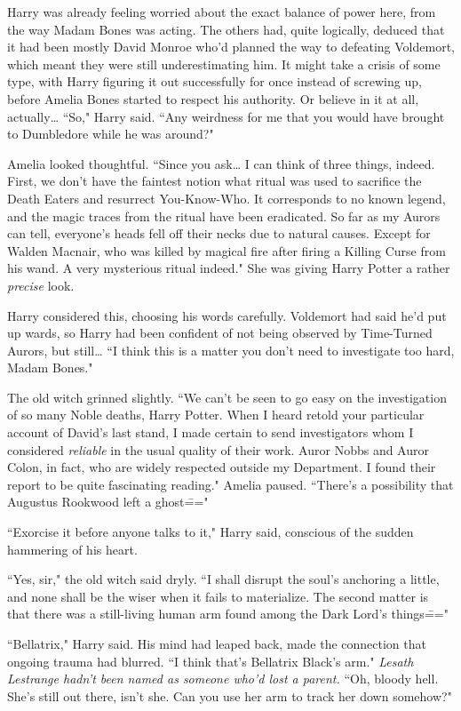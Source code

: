 Harry was already feeling worried about the exact balance of power here, from the way Madam Bones was acting. The others had, quite logically, deduced that it had been mostly David Monroe who'd planned the way to defeating Voldemort, which meant they were still underestimating him. It might take a crisis of some type, with Harry figuring it out successfully for once instead of screwing up, before Amelia Bones started to respect his authority. Or believe in it at all, actually{\ldots} ``So," Harry said. ``Any weirdness for me that you would have brought to Dumbledore while he was around?"

Amelia looked thoughtful. ``Since you ask{\ldots} I can think of three things, indeed. First, we don't have the faintest notion what ritual was used to sacrifice the Death Eaters and resurrect You-Know-Who. It corresponds to no known legend, and the magic traces from the ritual have been eradicated. So far as my Aurors can tell, everyone's heads fell off their necks due to natural causes. Except for Walden Macnair, who was killed by magical fire after firing a Killing Curse from his wand. A very mysterious ritual indeed." She was giving Harry Potter a rather \emph{precise} look.

Harry considered this, choosing his words carefully. Voldemort had said he'd put up wards, so Harry had been confident of not being observed by Time-Turned Aurors, but still{\ldots} ``I think this is a matter you don't need to investigate too hard, Madam Bones."

The old witch grinned slightly. ``We can't be seen to go easy on the investigation of so many Noble deaths, Harry Potter. When I heard retold your particular account of David's last stand, I made certain to send investigators whom I considered \emph{reliable} in the usual quality of their work. Auror Nobbs and Auror Colon, in fact, who are widely respected outside my Department. I found their report to be quite fascinating reading." Amelia paused. ``There's a possibility that Augustus Rookwood left a ghost\==="

``Exorcise it before anyone talks to it," Harry said, conscious of the sudden hammering of his heart.

``Yes, sir," the old witch said dryly. ``I shall disrupt the soul's anchoring a little, and none shall be the wiser when it fails to materialize. The second matter is that there was a still-living human arm found among the Dark Lord's things\==="

``Bellatrix," Harry said. His mind had leaped back, made the connection that ongoing trauma had blurred. ``I think that's Bellatrix Black's arm." \emph{Lesath Lestrange hadn't been named as someone who'd lost a parent.} ``Oh, bloody hell. She's still out there, isn't she. Can you use her arm to track her down somehow?"

